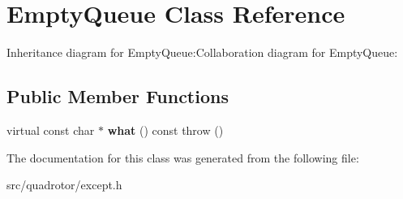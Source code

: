 \hypertarget{classEmptyQueue}{
\section{EmptyQueue Class Reference}
\label{classEmptyQueue}
}
Inheritance diagram for EmptyQueue:Collaboration diagram for EmptyQueue:\subsection*{Public Member Functions}
\begin{DoxyCompactItemize}
\item 
\hypertarget{classEmptyQueue_a57d73966a7700462d877b441299522d0}{
virtual const char $\ast$ {\bfseries what} () const   throw ()}
\label{classEmptyQueue_a57d73966a7700462d877b441299522d0}

\end{DoxyCompactItemize}


The documentation for this class was generated from the following file:\begin{DoxyCompactItemize}
\item 
src/quadrotor/except.h\end{DoxyCompactItemize}

